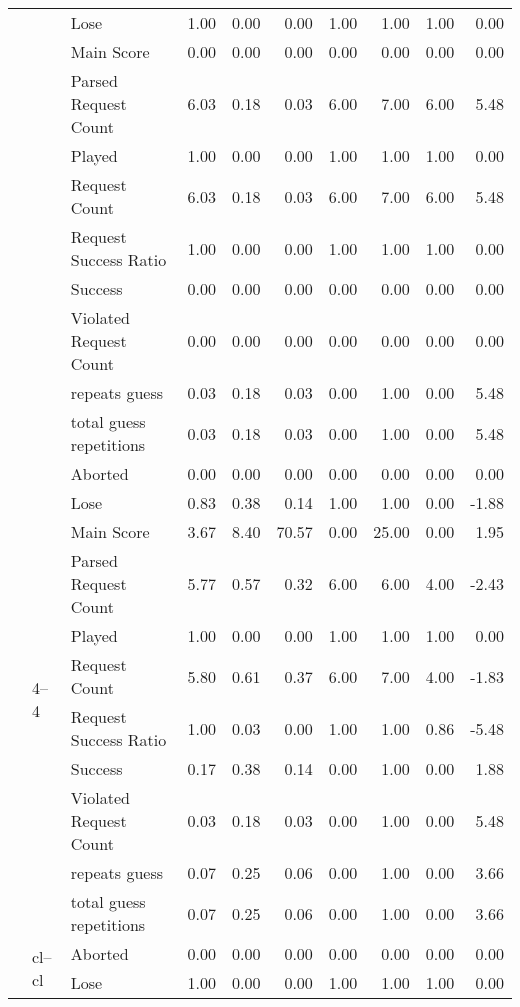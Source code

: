 \begin{tabular}{lllrrrrrrr}
 &  & Lose & 1.00 & 0.00 & 0.00 & 1.00 & 1.00 & 1.00 & 0.00 \\
 &  & Main Score & 0.00 & 0.00 & 0.00 & 0.00 & 0.00 & 0.00 & 0.00 \\
 &  & Parsed Request Count & 6.03 & 0.18 & 0.03 & 6.00 & 7.00 & 6.00 & 5.48 \\
 &  & Played & 1.00 & 0.00 & 0.00 & 1.00 & 1.00 & 1.00 & 0.00 \\
 &  & Request Count & 6.03 & 0.18 & 0.03 & 6.00 & 7.00 & 6.00 & 5.48 \\
 &  & Request Success Ratio & 1.00 & 0.00 & 0.00 & 1.00 & 1.00 & 1.00 & 0.00 \\
 &  & Success & 0.00 & 0.00 & 0.00 & 0.00 & 0.00 & 0.00 & 0.00 \\
 &  & Violated Request Count & 0.00 & 0.00 & 0.00 & 0.00 & 0.00 & 0.00 & 0.00 \\
 &  & repeats guess & 0.03 & 0.18 & 0.03 & 0.00 & 1.00 & 0.00 & 5.48 \\
 &  & total guess repetitions & 0.03 & 0.18 & 0.03 & 0.00 & 1.00 & 0.00 & 5.48 \\
\cline{2-10}
 & \multirow[t]{11}{*}{4--4} & Aborted & 0.00 & 0.00 & 0.00 & 0.00 & 0.00 & 0.00 & 0.00 \\
 &  & Lose & 0.83 & 0.38 & 0.14 & 1.00 & 1.00 & 0.00 & -1.88 \\
 &  & Main Score & 3.67 & 8.40 & 70.57 & 0.00 & 25.00 & 0.00 & 1.95 \\
 &  & Parsed Request Count & 5.77 & 0.57 & 0.32 & 6.00 & 6.00 & 4.00 & -2.43 \\
 &  & Played & 1.00 & 0.00 & 0.00 & 1.00 & 1.00 & 1.00 & 0.00 \\
 &  & Request Count & 5.80 & 0.61 & 0.37 & 6.00 & 7.00 & 4.00 & -1.83 \\
 &  & Request Success Ratio & 1.00 & 0.03 & 0.00 & 1.00 & 1.00 & 0.86 & -5.48 \\
 &  & Success & 0.17 & 0.38 & 0.14 & 0.00 & 1.00 & 0.00 & 1.88 \\
 &  & Violated Request Count & 0.03 & 0.18 & 0.03 & 0.00 & 1.00 & 0.00 & 5.48 \\
 &  & repeats guess & 0.07 & 0.25 & 0.06 & 0.00 & 1.00 & 0.00 & 3.66 \\
 &  & total guess repetitions & 0.07 & 0.25 & 0.06 & 0.00 & 1.00 & 0.00 & 3.66 \\
\cline{2-10}
 & \multirow[t]{11}{*}{cl--cl} & Aborted & 0.00 & 0.00 & 0.00 & 0.00 & 0.00 & 0.00 & 0.00 \\
 &  & Lose & 1.00 & 0.00 & 0.00 & 1.00 & 1.00 & 1.00 & 0.00 \\

\end{tabular}
